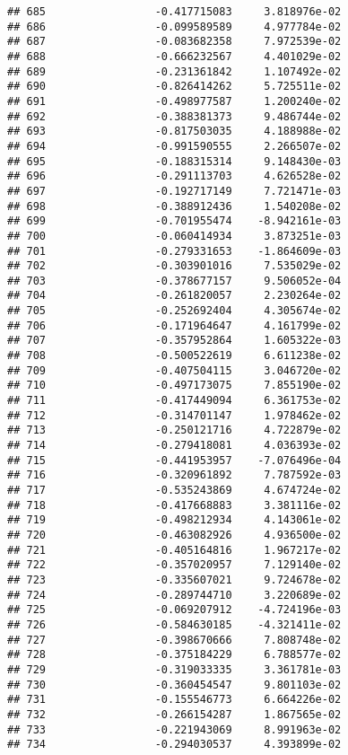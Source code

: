 \documentclass[
]{article}
\begin{document}
\begin{verbatim}
## 685                 -0.417715083     3.818976e-02
## 686                 -0.099589589     4.977784e-02
## 687                 -0.083682358     7.972539e-02
## 688                 -0.666232567     4.401029e-02
## 689                 -0.231361842     1.107492e-02
## 690                 -0.826414262     5.725511e-02
## 691                 -0.498977587     1.200240e-02
## 692                 -0.388381373     9.486744e-02
## 693                 -0.817503035     4.188988e-02
## 694                 -0.991590555     2.266507e-02
## 695                 -0.188315314     9.148430e-03
## 696                 -0.291113703     4.626528e-02
## 697                 -0.192717149     7.721471e-03
## 698                 -0.388912436     1.540208e-02
## 699                 -0.701955474    -8.942161e-03
## 700                 -0.060414934     3.873251e-03
## 701                 -0.279331653    -1.864609e-03
## 702                 -0.303901016     7.535029e-02
## 703                 -0.378677157     9.506052e-04
## 704                 -0.261820057     2.230264e-02
## 705                 -0.252692404     4.305674e-02
## 706                 -0.171964647     4.161799e-02
## 707                 -0.357952864     1.605322e-03
## 708                 -0.500522619     6.611238e-02
## 709                 -0.407504115     3.046720e-02
## 710                 -0.497173075     7.855190e-02
## 711                 -0.417449094     6.361753e-02
## 712                 -0.314701147     1.978462e-02
## 713                 -0.250121716     4.722879e-02
## 714                 -0.279418081     4.036393e-02
## 715                 -0.441953957    -7.076496e-04
## 716                 -0.320961892     7.787592e-03
## 717                 -0.535243869     4.674724e-02
## 718                 -0.417668883     3.381116e-02
## 719                 -0.498212934     4.143061e-02
## 720                 -0.463082926     4.936500e-02
## 721                 -0.405164816     1.967217e-02
## 722                 -0.357020957     7.129140e-02
## 723                 -0.335607021     9.724678e-02
## 724                 -0.289744710     3.220689e-02
## 725                 -0.069207912    -4.724196e-03
## 726                 -0.584630185    -4.321411e-02
## 727                 -0.398670666     7.808748e-02
## 728                 -0.375184229     6.788577e-02
## 729                 -0.319033335     3.361781e-03
## 730                 -0.360454547     9.801103e-02
## 731                 -0.155546773     6.664226e-02
## 732                 -0.266154287     1.867565e-02
## 733                 -0.221943069     8.991963e-02
## 734                 -0.294030537     4.393899e-02

\end{verbatim}
\end{document}
